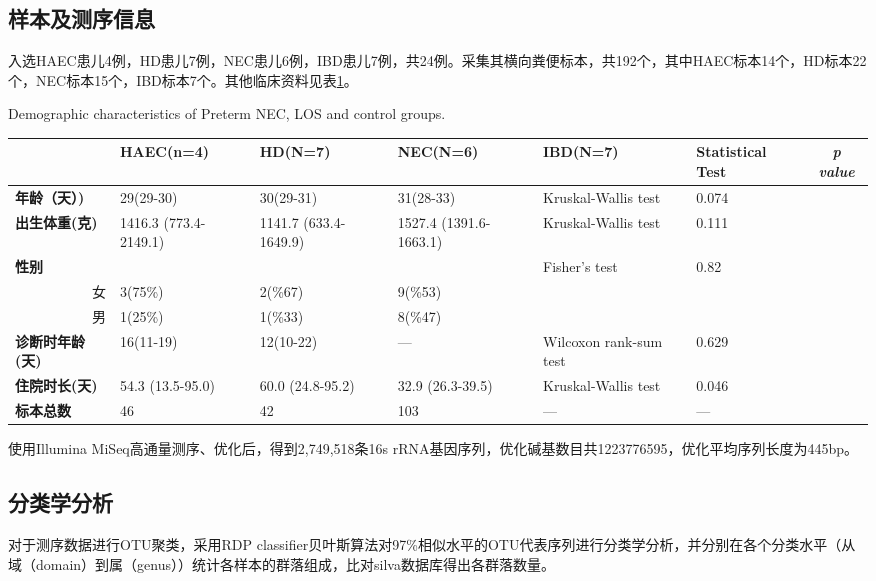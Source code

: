   \subsection{样本及测序信息}
  入选HAEC患儿4例，HD患儿7例，NEC患儿6例，IBD患儿7例，共24例。采集其横向粪便标本，共192个，其中HAEC标本14个，HD标本22个，NEC标本15个，IBD标本7个。其他临床资料见表\ref{tab:comparedemographic}。

  \begin{table}[!hpb]
    \centering
      {Demographic characteristics of Preterm NEC, LOS and control groups.}
    \label{tab:comparedemographic}
    \begin{tabular}{lp{1.8cm}p{1.8cm}p{1.8cm}p{1.8cm}p{2cm}c}
      \toprule
         & \textbf{HAEC(n=4)} & \textbf{HD(N=7)} & \textbf{NEC(N=6)} & \textbf{IBD(N=7)} & \textbf{Statistical Test} & \textit{p value} \\ \midrule
        \textbf{年龄（天）)} & 29(29-30) & 30(29-31) & 31(28-33) & Kruskal-Wallis test & 0.074 \\
        \textbf{出生体重(克)} & 1416.3 (773.4-2149.1) & 1141.7 (633.4-1649.9) & 1527.4 (1391.6-1663.1) & Kruskal-Wallis test & 0.111 \\
        \textbf{性别} &  &  &  & Fisher's test & 0.82 \\
        \multicolumn{1}{r}{女} & 3(75\%) & 2(\%67) & 9(\%53) &  & \\
        \multicolumn{1}{r}{男} & 1(25\%) & 1(\%33) & 8(\%47) &  & \\
        \textbf{诊断时年龄(天)} & 16(11-19) & 12(10-22) & — & Wilcoxon rank-sum test & 0.629 \\
        \textbf{住院时长(天)} & 54.3 (13.5-95.0) & 60.0 (24.8-95.2) & 32.9 (26.3-39.5) & Kruskal-Wallis test & 0.046 \\
        \textbf{标本总数} & 46 & 42 & 103 & — & — \\ \bottomrule
    \end{tabular}
  \end{table}


  使用Illumina MiSeq高通量测序、优化后，得到2,749,518条16s rRNA基因序列，优化碱基数目共1223776595，优化平均序列长度为445bp。

  \subsection{分类学分析}
  对于测序数据进行OTU聚类，采用RDP classifier贝叶斯算法对97\%相似水平的OTU代表序列进行分类学分析，并分别在各个分类水平（从域（domain）到属（genus））统计各样本的群落组成，比对silva数据库得出各群落数量。
